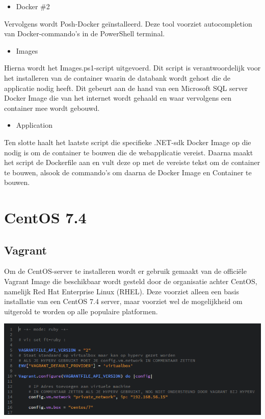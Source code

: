 \begin{itemize}[noitemsep]
	\item Docker \#2
\end{itemize}

Vervolgens wordt Posh-Docker geïnstalleerd. Deze tool voorziet autocompletion van Docker-commando's in de PowerShell terminal.

\begin{itemize}[noitemsep]
	\item Images
\end{itemize}

Hierna wordt het Images.ps1-script uitgevoerd. Dit script is verantwoordelijk voor het installeren van de container waarin de databank wordt gehost die de applicatie nodig heeft. Dit gebeurt aan de hand van een Microsoft SQL server Docker Image die van het internet wordt gehaald en waar vervolgens een container mee wordt gebouwd.

\begin{itemize}[noitemsep]
	\item Application
\end{itemize}

Ten slotte haalt het laatste script die specifieke .NET-sdk Docker Image op die nodig is om de container te bouwen die de webapplicatie vereist. Daarna maakt het script de Dockerfile aan en vult deze op met de vereiste tekst om de container te bouwen, alsook de commando's om daarna de Docker Image en Container te bouwen.

\section{CentOS 7.4}

\subsection{Vagrant}
Om de CentOS-server te installeren wordt er gebruik gemaakt van de officiële Vagrant Image die beschikbaar wordt gesteld door de organisatie achter CentOS, namelijk Red Hat Enterprise Linux (RHEL). Deze voorziet alleen een basis installatie van een CentOS 7.4 server, maar voorziet wel de mogelijkheid om uitgerold te worden op alle populaire platformen.

\begin{center}
	\includegraphics[scale=0.75]{img/centosvagrant01}
\end{center}

